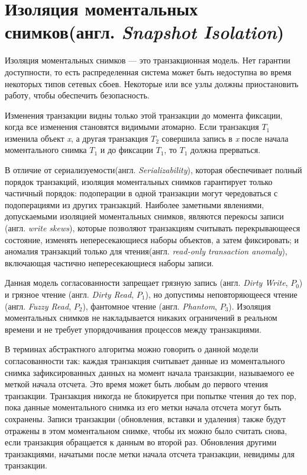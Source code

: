 \documentclass[12pt,  openany]{book}
\begin{document}
\section{Изоляция моментальных снимков(англ.  \textit{Snapshot Isolation})\cite{jepsenConsistencyModels}}
Изоляция моментальных снимков --- это транзакционная модель. Нет гарантии доступности, то есть распределенная система может быть недоступна во время некоторых типов сетевых сбоев. Некоторые или все узлы должны приостановить работу, чтобы обеспечить безопасность.

\par Изменения транзакции видны только этой транзакции до момента фиксации, когда все изменения становятся видимыми атомарно. Если транзакция $T_1$ изменила объект \textit{x}, а другая транзакция $T_2$ совершила запись в \textit{x} после начала моментального снимка $T_1$ и до фиксации $T_1$, то $T_1$ должна прерваться.
\par
В отличие от сериализуемости(англ. \textit{Serializability}), которая обеспечивает полный порядок транзакций, изоляция моментальных снимков гарантирует только частичный порядок: подоперации в одной транзакции могут чередоваться с подоперациями из других транзакций. Наиболее заметными явлениями, допускаемыми изоляцией моментальных снимков, являются перекосы записи (англ. \textit{write skews}), которые позволяют транзакциям считывать перекрывающееся состояние, изменять непересекающиеся наборы объектов, а затем фиксировать; и аномалия транзакций только для чтения(англ.  \textit{read-only transaction anomaly}), включающая частично непересекающиеся наборы записи.
\par
Данная модель согласованности запрещает грязную запись (англ. \textit{Dirty Write}, $P_0$) и грязное чтение (англ.  \textit{Dirty Read}, $P_1$), но допустимы неповторяющееся чтение (англ. \textit{Fuzzy Read}, $P_2$), фантомное чтение (англ. \textit{Phantom}, $P_3$)\cite{adya99:_weak_consis}. Изоляция моментальных снимков не накладывается никаких ограничений в реальном времени и не требует упорядочивания процессов между транзакциями.
\par
\cite {BerensonIsolationLevels} В терминах абстрактного алгоритма можно говорить о данной модели согласованности так: каждая транзакция считывает данные из моментального снимка зафиксированных данных на момент начала транзакции, называемого ее меткой начала отсчета. Это время может быть любым до первого чтения транзакции. Транзакция никогда не блокируется при попытке чтения до тех пор, пока данные моментального снимка из его метки начала отсчета могут быть сохранены. Записи транзакции (обновления, вставки и удаления) также будут отражены в этом моментальном снимке, чтобы их можно было считать снова, если транзакция обращается к данным во второй раз. Обновления другими транзакциями, начатыми после метки начала отсчета транзакции, невидимы для транзакции. 
\end{document}
